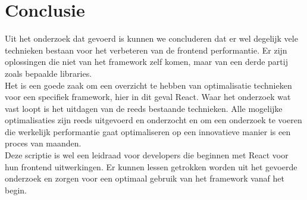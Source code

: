 
\chapter{Conclusie}
\label{ch:conclusie}


Uit het onderzoek dat gevoerd is kunnen we concluderen dat er wel degelijk vele technieken bestaan voor het verbeteren van de frontend performantie. Er zijn oplossingen die niet van het framework zelf komen, maar van een derde partij zoals bepaalde libraries.\\
Het is een goede zaak om een overzicht te hebben van optimalisatie technieken voor een specifiek framework, hier in dit geval React. Waar het onderzoek wat vast loopt is het uitdagen van de reeds bestaande technieken. Alle mogelijke optimalisaties zijn reeds uitgevoerd en onderzocht en om een onderzoek te voeren die werkelijk performantie gaat optimaliseren op een innovatieve manier is een proces van maanden. \\
Deze scriptie is wel een leidraad voor developers die beginnen met React voor hun frontend uitwerkingen. Er kunnen lessen getrokken worden uit het gevoerde onderzoek en zorgen voor een optimaal gebruik van het framework vanaf het begin. 

